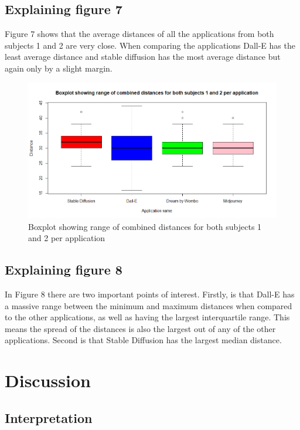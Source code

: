 \documentclass[]{report}
\begin{document}
	\subsection{Explaining figure 7}
	Figure 7 shows that the average distances of all the applications from both subjects 1 and 2 are very close. When comparing the applications Dall-E has the least average distance and stable diffusion has the most average distance but again only by a slight margin. 
	
	\begin{figure}[!htbp]
		\centering
		\includegraphics[width=1\linewidth, trim=0 0 0 50, clip]{boxplotWithAllData}
		\caption{Boxplot showing range of combined distances for both subjects 1 and 2 per application}
		\label{fig:boxplotwithalldata}
	\end{figure}
	\pagebreak
	\subsection{Explaining figure 8}
	
	In Figure 8 there are two important points of interest. Firstly, is that Dall-E has a massive range between the minimum and maximum distances when compared to the other applications, as well as having the largest interquartile range. This means the spread of the distances is also the largest out of any of the other applications. Second is that Stable Diffusion has the largest median distance. 
	
	
	\pagebreak
	\section{Discussion}
	
	\subsection{Interpretation}
	
\end{document}
